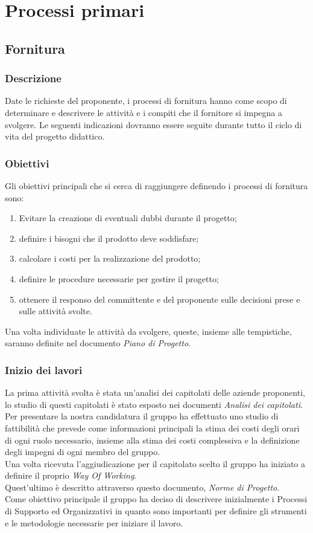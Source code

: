 \section{Processi primari} 

\subsection{Fornitura} 
\subsubsection{Descrizione}
Date le richieste del proponente, i processi di fornitura hanno come scopo di determinare e descrivere le attività e i compiti che il fornitore si impegna a svolgere.
Le seguenti indicazioni dovranno essere seguite durante tutto il ciclo di vita del progetto didattico.

\subsubsection{Obiettivi} 
Gli obiettivi principali che si cerca di raggiungere definendo i processi di fornitura sono: 
\begin{enumerate}
    \item Evitare la creazione di eventuali dubbi durante il progetto; 
    \item definire i bisogni che il prodotto deve soddisfare; 
    \item calcolare i costi per la realizzazione del prodotto; 
    \item definire le procedure necessarie per gestire il progetto; 
    \item ottenere il responso del committente e del proponente sulle decisioni prese e sulle attività svolte.
\end{enumerate}
Una volta individuate le attività da svolgere, queste, insieme alle tempistiche, 
saranno definite nel documento \textit{Piano di Progetto}.


\subsubsection{Inizio dei lavori} 
La prima attività svolta è stata un'analisi dei capitolati delle aziende proponenti, lo studio di questi capitolati è stato esposto nei documenti \textit{Analisi dei capitolati}. \\
Per presentare la nostra candidatura il gruppo ha effettuato uno studio di fattibilità che 
prevede come informazioni principali la stima dei costi degli orari di ogni ruolo necessario, 
insieme alla stima dei costi complessiva e la definizione degli impegni di ogni membro del gruppo. \\
Una volta ricevuta l'aggiudicazione per il capitolato scelto il gruppo ha iniziato a definire il proprio \textit{Way Of Working}. \\
Quest'ultimo è descritto attraverso questo documento, \textit{Norme di Progetto}. \\
Come obiettivo principale il gruppo ha deciso di descrivere inizialmente i Processi di Supporto ed Organizzativi in quanto sono 
importanti per definire gli strumenti e le metodologie necessarie per iniziare il lavoro. 



